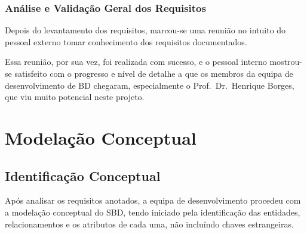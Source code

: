 \documentclass[a4paper,12pt]{scrreprt}
\begin{document}
        \subsubsection{Análise e Validação Geral dos Requisitos}
        Depois do levantamento dos requisitos, marcou-se uma reunião no intuito do pessoal
        externo tomar conhecimento dos requisitos documentados.

        Essa reunião, por sua vez, foi realizada com sucesso, e o pessoal interno
        mostrou-se satisfeito com o progresso e nível de detalhe a que os membros
        da equipa de desenvolvimento de BD chegaram, especialmente o Prof.\ Dr.\ Henrique
        Borges, que viu muito potencial neste projeto.
    \newpage
    \section{Modela\c{c}\~ao Conceptual}
        \subsection{Identificação Conceptual}
             Após analisar os requisitos anotados, a equipa de desenvolvimento procedeu com a 
             modelação conceptual do SBD, tendo iniciado pela identificação das entidades,
             relacionamentos e os atributos de cada uma, não incluíndo chaves estrangeiras.
\end{document}
